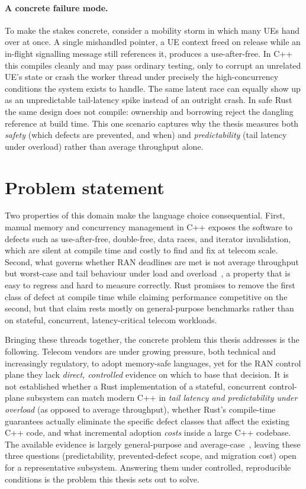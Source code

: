 \documentclass[english,oneside,a4paper,censored,csm,software-track-2020]{HYthesisML}
\begin{document}
\paragraph{A concrete failure mode.}
To make the stakes concrete, consider a mobility storm in which many UEs hand over at once. A
single mishandled pointer, a UE context freed on release while an in-flight signalling message
still references it, produces a use-after-free. In C++ this compiles cleanly and may pass
ordinary testing, only to corrupt an unrelated UE's state or crash the worker thread under
precisely the high-concurrency conditions the system exists to handle. The same latent race
can equally show up as an unpredictable tail-latency spike instead of an outright crash. In
safe Rust the same design does not compile: ownership and borrowing reject the dangling
reference at build time. This one scenario captures why the thesis measures both
\emph{safety} (which defects are prevented, and when) and \emph{predictability} (tail
latency under overload) rather than average throughput alone.

\section{Problem statement}
Two properties of this domain make the language choice consequential. First, manual memory and
concurrency management in C++ exposes the software to defects such as use-after-free,
double-free, data races, and iterator invalidation, which are silent at compile time and costly
to find and fix at telecom scale. Second, what governs whether RAN deadlines are met is not
average throughput but worst-case and tail behaviour under load and
overload~\cite{dean2013tail}, a property that is easy to regress and hard to measure correctly.
Rust promises to remove the first class of defect at compile time while claiming performance
competitive on the second, but that claim rests mostly on general-purpose benchmarks rather
than on stateful, concurrent, latency-critical telecom workloads.

Bringing these threads together, the concrete problem this thesis addresses is the following.
Telecom vendors are under growing pressure, both technical and increasingly regulatory, to adopt
memory-safe languages, yet for the RAN control plane they lack \emph{direct, controlled}
evidence on which to base that decision. It is not established whether a Rust implementation of
a stateful, concurrent control-plane subsystem can match modern C++ in \emph{tail latency and
predictability under overload} (as opposed to average throughput), whether Rust's compile-time
guarantees actually eliminate the specific defect classes that affect the existing C++ code,
and what incremental adoption \emph{costs} inside a large C++ codebase. The available evidence
is largely general-purpose and average-case~\cite{balasubramanian2017rust,qin2020rust}, leaving
these three questions (predictability, prevented-defect scope, and migration cost) open for a
representative subsystem. Answering them under controlled, reproducible conditions is the
problem this thesis sets out to solve.
\end{document}
